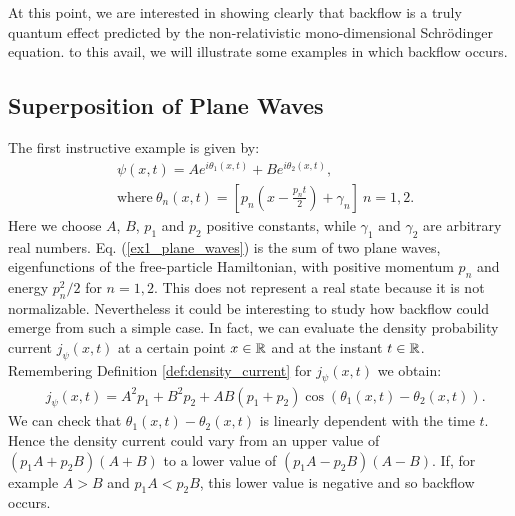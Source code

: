 At this point, we are interested in showing clearly that backflow is a truly quantum effect predicted by the non-relativistic mono-dimensional Schr\"{o}dinger equation. to this avail, we will illustrate some examples in which backflow occurs.

\subsection{Superposition of Plane Waves}

The first instructive example is given by:
\begin{equation}
\begin{aligned}
&\psi(x,t)=Ae^{i\theta_1(x,t)}+Be^{i\theta_2(x,t)},\\
&\text{where}\ \theta_n(x,t)=\left[p_n\left(x-\frac{p_n t}{2}\right)+\gamma_n\right]\ n=1,2.
\end{aligned}
\label{ex1_plane_waves}
\end{equation}
Here we choose $A$, $B$, $p_1$ and $p_2$ positive constants, while $\gamma_1$ and $\gamma_2$ are arbitrary real numbers. Eq. (\ref{ex1_plane_waves}) is the sum of two plane waves, eigenfunctions of the free-particle Hamiltonian, with positive momentum $p_n$ and energy $p_n^2/2$ for $n=1,2$. This does not represent a real state because it is not normalizable. Nevertheless it could be interesting to study how backflow could emerge from such a simple case. In fact, we can evaluate the density probability current $j_\psi(x,t)$ at a certain point $x\in{\mathbb R}$ and at the instant $t\in{\mathbb R}$. Remembering Definition \ref{def:density_current} for $j_\psi(x,t)$ we obtain:
\begin{equation}
\begin{aligned}
& j_\psi(x,t)=A^2p_1+B^2p_2+AB(p_1+p_2)\cos(\theta_1(x,t)-\theta_2(x,t)).
\end{aligned}
\end{equation}
We can check that $\theta_1(x,t)-\theta_2(x,t)$ is linearly dependent with the time $t$. Hence the density current could vary from an upper value of $(p_1A+p_2B)(A+B)$ to a lower value of $(p_1A-p_2B)(A-B)$. If, for example $A>B$ and $p_1A<p_2B$, this lower value is negative and so backflow occurs.\\ %
